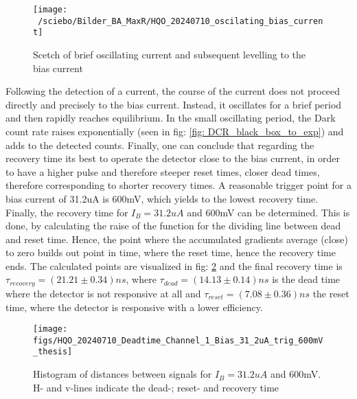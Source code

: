 \begin{figure}[hhh]
 \centering
 \texttt{[image: ~/sciebo/Bilder\_BA\_MaxR/HQO\_20240710\_oscilating\_bias\_current]}
 \caption{Scetch of brief oscillating current and subsequent levelling to the bias current}
 \label{fig: Oscillating_bias_current}
\end{figure}

Following the detection of a current, the course of the current does not proceed directly and precisely to the bias current.
Instead, it oscillates for a brief period and then rapidly reaches equilibrium.
In the small oscillating period, the Dark count rate raises exponentially (seen in fig: \ref{fig: DCR_black_box_to_exp})
and adds to the detected counts.
Finally, one can conclude that regarding the recovery time its best to operate the detector close to the bias current,
in order to have a higher pulse and therefore steeper reset times, closer dead times, therefore
corresponding to shorter recovery times.
A reasonable trigger point for a bias current of 31.2uA is 600mV, which yields to the lowest recovery time.
Finally, the recovery time for $I_{B} = 31.2uA$ and 600mV can be determined.
This is done, by calculating the raise of the function for the dividing line between dead and reset time.
Hence, the point where the accumulated gradients average (close) to zero builds out point in time, where the reset
time, hence the recovery time ends.
The calculated points are visualized in fig: \ref{fig: recovery_time} and the final recovery time is
$\tau_{recovery} = (21.21 \pm 0.34) ns$, where $\tau_{dead} = (14.13 \pm 0.14) ns$ is the dead time where the detector is
not responsive at all and $\tau_{reset} = (7.08 \pm 0.36) ns$  the reset time, where the detector is responsive with a
lower efficiency.

\begin{figure}[hhh]
 \centering
 \texttt{[image: figs/HQO\_20240710\_Deadtime\_Channel\_1\_Bias\_31\_2uA\_trig\_600mV\_thesis]}
 \caption{Histogram of distances between signals for $I_{B} = 31.2uA$ and 600mV. H- and v-lines indicate the dead-;
 reset- and recovery time}
 \label{fig: recovery_time}
\end{figure}

\newpage
